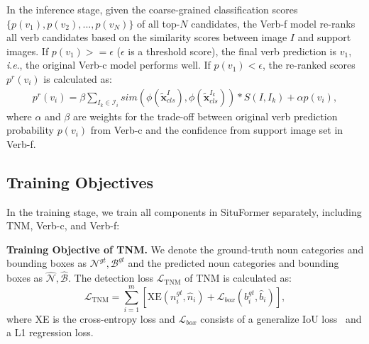 \documentclass[letterpaper]{article} \usepackage{aaai22}  \usepackage{times}  \usepackage{helvet}  \usepackage{courier}  \usepackage[hyphens]{url}  \usepackage{graphicx} \urlstyle{rm} \def\UrlFont{\rm}  \usepackage{natbib}  \usepackage{caption} \DeclareCaptionStyle{ruled}{labelfont=normalfont,labelsep=colon,strut=off} \frenchspacing  \setlength{\pdfpagewidth}{8.5in}  \setlength{\pdfpageheight}{11in}
\newcommand{\ie}{\textit{i}.\textit{e}.}
\begin{document}
In the inference stage, given the coarse-grained classification scores $\{p(v_1),p(v_2),...,p(v_N)\}$ of all top-$N$ candidates, the Verb-f model re-ranks all verb candidates based on the similarity scores between image $I$ and support images. If $p(v_1) >= \epsilon$ ($\epsilon$ is a threshold score), the final verb prediction is $v_1$, \ie, the original Verb-c model performs well. If $p(v_1) < \epsilon$, the re-ranked scores $p^r(v_i)$ is calculated as:
\begin{equation}
\begin{aligned}
p^r(v_i) = \beta \sum_{I_k \in \mathcal{I}_i} sim(\phi(\tilde{\bm{x}}_{cls}^I), \phi(\tilde{\bm{x}}_{cls}^{I_k})) * S(I, I_k) + \alpha p(v_i),
\end{aligned}
\end{equation}
where $\alpha$ and $\beta$ are weights for the trade-off between original verb prediction probability $p(v_i)$ from Verb-c and the confidence from support image set in Verb-f.































\subsection{Training Objectives}
\label{sec:training}

In the training stage, we train all components in SituFormer separately, including TNM, Verb-c, and Verb-f:

\noindent\textbf{Training Objective of TNM.}
We denote the ground-truth noun categories and bounding boxes as $\mathcal{N}^{gt}, \mathcal{B}^{gt}$ and the predicted noun categories and bounding boxes as $\hat{\mathcal{N}},\hat{\mathcal{B}}$. The detection loss $\mathcal{L}_{\text{TNM}}$ of TNM is calculated as:
\begin{equation}
   \mathcal{L}_{\text{TNM}} = \sum_{i=1}^{m} \left[\text{XE}(n^{gt}_i, \hat{n}_i) + \mathcal{L}_{box}(b^{gt}_i, \hat{b}_i)\right],
\end{equation}
where XE is the cross-entropy loss and $\mathcal{L}_{box}$ consists of a generalize IoU loss~\cite{rezatofighi2019generalized} and a L1 regression loss.
\end{document}
